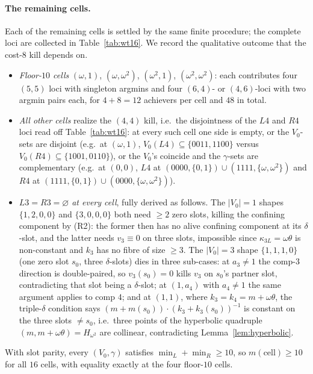 \documentclass[11pt]{article}
\theoremstyle{plain}
\theoremstyle{definition}
\theoremstyle{remark}
\begin{document}
\paragraph{The remaining cells.}
Each of the remaining cells is settled by the same finite procedure; the complete loci are
collected in Table~\ref{tab:wt16}. We record the qualitative outcome that the cost-$8$ kill
depends on.
\begin{itemize}
\item \emph{Floor-$10$ cells} $(\omega,1)$, $(\omega,\omega^2)$, $(\omega^2,1)$,
  $(\omega^2,\omega^2)$: each contributes four $(5,5)$ loci with singleton argmins and four
  $(6,4)$- or $(4,6)$-loci with two argmin pairs each, for $4+8=12$ achievers per cell and
  $48$ in total.
\item \emph{All other cells} realize the $(4,4)$ kill, i.e.\ the disjointness of the $L4$ and
  $R4$ loci read off Table~\ref{tab:wt16}: at every such cell one side is empty, or the
  $V_0$-sets are disjoint (e.g.\ at $(\omega,1)$, $V_0(L4)\subseteq\{0011,1100\}$ versus
  $V_0(R4)\subseteq\{1001,0110\}$), or the $V_0$'s coincide and the $\gamma$-sets are
  complementary (e.g.\ at $(0,0)$, $L4$ at $(0000,\{0,1\})\cup(1111,\{\omega,\omega^2\})$ and
  $R4$ at $(1111,\{0,1\})\cup(0000,\{\omega,\omega^2\})$).
\item \emph{$L3=R3=\varnothing$ at every cell}, fully derived as follows. The $|V_0|=1$ shapes
  $\{1,2,0,0\}$ and $\{3,0,0,0\}$ both need $\ge 2$ zero slots, killing the confining
  component by (R2): the former then has no alive confining component at its $\delta$-slot,
  and the latter needs $v_3\equiv 0$ on three slots, impossible since $\kappa_{3L}=\omega\theta$
  is non-constant and $k_3$ has no fibre of size $\ge 3$. The $|V_0|=3$ shape $\{1,1,1,0\}$
  (one zero slot $s_0$, three $\delta$-slots) dies in three sub-cases: at $a_3\ne 1$ the
  comp-$3$ direction is double-paired, so $v_3(s_0)=0$ kills $v_3$ on $s_0$'s partner slot,
  contradicting that slot being a $\delta$-slot; at $(1,a_4)$ with $a_4\ne 1$ the same
  argument applies to comp $4$; and at $(1,1)$, where $k_3=k_4=m+\omega\theta$, the triple-$\delta$
  condition says $(m+m(s_0))\cdot(k_3+k_3(s_0))^{-1}$ is constant on the three slots
  $\ne s_0$, i.e.\ three points of the hyperbolic quadruple $(m,m+\omega\theta)=H_{\omega^2}$
  are collinear, contradicting Lemma~\ref{lem:hyperbolic}.
\end{itemize}
With slot parity, every $(V_0,\gamma)$ satisfies $\min_L+\min_R\ge 10$, so $m(\text{cell})\ge
10$ for all $16$ cells, with equality exactly at the four floor-$10$ cells.
\end{document}
